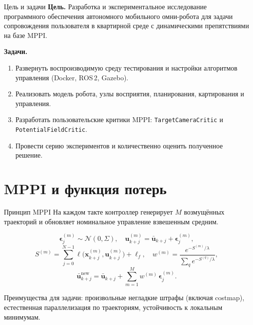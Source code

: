 \documentclass[aspectratio=169,12pt]{beamer}
\begin{document}
\begin{frame}{Цель и задачи}
    \textbf{Цель.} Разработка и экспериментальное исследование
    программного обеспечения автономного мобильного омни-робота для
    задачи сопровождения пользователя в квартирной среде с
    динамическими препятствиями на базе MPPI.
    \medskip

    \textbf{Задачи.}
    \begin{enumerate}
        \item Развернуть воспроизводимую среду тестирования и настройки алгоритмов управления
              (Docker, ROS\,2, Gazebo).
        \item Реализовать модель робота, узлы восприятия, планирования, картирования и управления.
        \item Разработать пользовательские критики MPPI:
              \texttt{TargetCameraCritic} и
              \texttt{PotentialFieldCritic}.
        \item Провести серию экспериментов и количественно оценить
              полученное решение.
    \end{enumerate}
\end{frame}

\section{MPPI и функция потерь}

\begin{frame}{Принцип MPPI}
    На каждом такте контроллер генерирует $M$ возмущённых траекторий и
    обновляет номинальное управление взвешенным средним.
    \medskip

    \[
    \boldsymbol{\epsilon}^{(m)}_{j} \sim \mathcal{N}(0,\Sigma),\quad
    \mathbf{u}^{(m)}_{k+j} = \bar{\mathbf{u}}_{k+j} + \boldsymbol{\epsilon}^{(m)}_{j},
    \]
    \[
    S^{(m)} = \sum_{j=0}^{N-1} \ell\bigl(\mathbf{x}^{(m)}_{k+j},\mathbf{u}^{(m)}_{k+j}\bigr) + \ell_f,
    \quad
    w^{(m)} = \frac{e^{-S^{(m)}/\lambda}}{\sum_q e^{-S^{(q)}/\lambda}},
    \]
    \[
    \bar{\mathbf{u}}^{\text{new}}_{k+j} =
    \bar{\mathbf{u}}_{k+j} + \sum_{m=1}^{M} w^{(m)}\,\boldsymbol{\epsilon}^{(m)}_{j}.
    \]

    \medskip
    \footnotesize
    Преимущества для задачи: произвольные негладкие штрафы (включая
    costmap), естественная параллелизация по траекториям,
    устойчивость к локальным минимумам.
\end{frame}
\end{document}
